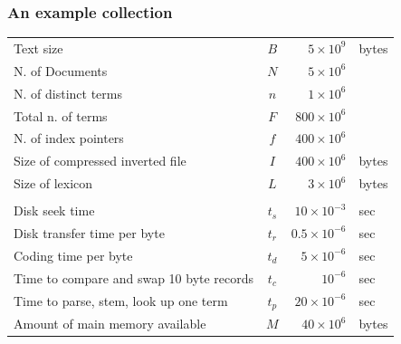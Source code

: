 \documentclass[svgnames]{beamer}
\begin{document}
\begin{frame}
    \frametitle{An example collection}
    
    \small

    \begin{block}{}
        \centering
        \begin{tabular}{lcr@{~}l}
            Text size & $B$ & $5 \times 10^9$ & bytes \\
            N. of Documents & $N$ & $5 \times 10^6$ & \\
            N. of distinct terms & $n$ & $1 \times 10^6$ & \\
            Total n. of terms & $F$ & $800 \times 10^6$ & \\
            N. of index pointers & $f$ & $400 \times 10^6$ & \\
            Size of compressed inverted file & $I$ & $400 \times 10^6$ & bytes\\
            Size of lexicon & $L$ & $3 \times 10^6$ & bytes\\
            \\
            Disk seek time & $t_s$ & $10 \times 10^{-3}$ & sec\\
            Disk transfer time per byte & $t_r$ & $0.5 \times 10^{-6}$ & sec\\
            Coding time per byte & $t_d$ & $5 \times 10^{-6}$ & sec\\
            Time to compare and swap 10 byte records & $t_c$ & $10^{-6}$ & sec\\
            Time to parse, stem, look up one term & $t_p$ & $20 \times 10^{-6}$ & sec\\
            Amount of main memory available & $M$ & $40 \times 10^6$ & bytes\\
        \end{tabular}
    \end{block}

\end{frame}
\end{document}
